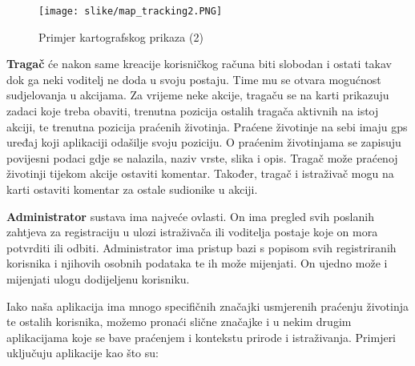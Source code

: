 		\begin{figure}[H]
			\texttt{[image: slike/map\_tracking2.PNG]} %
			\centering
			\caption{Primjer kartografskog prikaza (2)}
			\label{fig:promjene}
		\end{figure}
		
		\textbf{Tragač} će nakon same kreacije korisničkog računa biti slobodan i ostati takav dok ga neki voditelj ne doda u svoju postaju. Time mu se otvara mogućnost sudjelovanja u akcijama. Za vrijeme neke akcije, tragaču se na karti prikazuju zadaci koje treba obaviti, trenutna pozicija ostalih tragača aktivnih na istoj akciji, te trenutna pozicija praćenih životinja. Praćene životinje na sebi imaju gps uređaj koji aplikaciji odašilje svoju poziciju. O
		praćenim životinjama se zapisuju povijesni podaci gdje se nalazila, naziv vrste, slika i opis. Tragač može praćenoj životinji tijekom akcije ostaviti komentar. Također, tragač i istraživač mogu na karti ostaviti komentar za ostale sudionike u akciji.		
		
		\textbf{Administrator} sustava ima najveće ovlasti. On ima pregled svih poslanih zahtjeva za registraciju u ulozi istraživača ili voditelja postaje koje on mora potvrditi ili odbiti. Administrator ima pristup bazi s popisom svih registriranih korisnika i njihovih osobnih podataka te ih može mijenjati. On ujedno može i mijenjati ulogu dodijeljenu korisniku.
\vspace{12pt}

		Iako naša aplikacija ima mnogo specifičnih značajki usmjerenih praćenju životinja te ostalih korisnika, možemo pronaći slične značajke i u nekim drugim aplikacijama koje se bave praćenjem i kontekstu prirode i istraživanja. Primjeri uključuju aplikacije kao što su:
		
